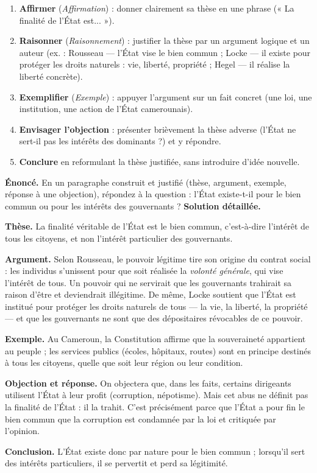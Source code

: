 \documentclass[11pt]{article}
\newcommand{\cle}[1]{{\popxbold\color{popdark}#1}}
\begin{document}
\begin{methode}
\begin{enumerate}
\item \textbf{Affirmer} (\emph{Affirmation}) : donner clairement sa thèse en une phrase (« La finalité de l'État est... »).
\item \textbf{Raisonner} (\emph{Raisonnement}) : justifier la thèse par un argument logique et un auteur (ex. : Rousseau — l'État vise le bien commun ; Locke — il existe pour protéger les droits naturels : vie, liberté, propriété ; Hegel — il réalise la liberté concrète).
\item \textbf{Exemplifier} (\emph{Exemple}) : appuyer l'argument sur un fait concret (une loi, une institution, une action de l'État camerounais).
\item \textbf{Envisager l'objection} : présenter brièvement la thèse adverse (l'État ne sert-il pas les intérêts des dominants ?) et y répondre.
\item \textbf{Conclure} en reformulant la thèse justifiée, sans introduire d'idée nouvelle.
\end{enumerate}
\end{methode}

\begin{exoresolu}
\textbf{Énoncé.} En un paragraphe construit et justifié (thèse, argument, exemple, réponse à une objection), répondez à la question : l'État existe-t-il pour le bien commun ou pour les intérêts des gouvernants ?
\tcblower
\textbf{Solution détaillée.}

\textbf{Thèse.} La finalité véritable de l'État est le \cle{bien commun}, c'est-à-dire l'intérêt de tous les citoyens, et non l'intérêt particulier des gouvernants.

\textbf{Argument.} Selon \cle{Rousseau}, le pouvoir légitime tire son origine du contrat social : les individus s'unissent pour que soit réalisée la \emph{volonté générale}, qui vise l'intérêt de tous. Un pouvoir qui ne servirait que les gouvernants trahirait sa raison d'être et deviendrait illégitime. De même, \cle{Locke} soutient que l'État est institué pour protéger les droits naturels de tous — la vie, la liberté, la propriété — et que les gouvernants ne sont que des dépositaires révocables de ce pouvoir.

\textbf{Exemple.} Au Cameroun, la Constitution affirme que la souveraineté appartient au peuple ; les services publics (écoles, hôpitaux, routes) sont en principe destinés à tous les citoyens, quelle que soit leur région ou leur condition.

\textbf{Objection et réponse.} On objectera que, dans les faits, certains dirigeants utilisent l'État à leur profit (corruption, népotisme). Mais cet abus ne définit pas la finalité de l'État : il la trahit. C'est précisément parce que l'État a pour fin le bien commun que la corruption est condamnée par la loi et critiquée par l'opinion.

\textbf{Conclusion.} L'État existe donc par nature pour le bien commun ; lorsqu'il sert des intérêts particuliers, il se pervertit et perd sa légitimité.
\end{exoresolu}
\end{document}
